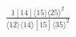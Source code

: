 \documentclass[varwidth, border=5pt]{standalone}
\begin{document}
\begin{my}
$\begin{gathered}
\scriptscriptstyle\frac{1[14]⟨15⟩⟨25⟩^2}{⟨12⟩⟨14⟩[15]⟨35⟩^2}
\end{gathered}$
\end{my}
\end{document}

